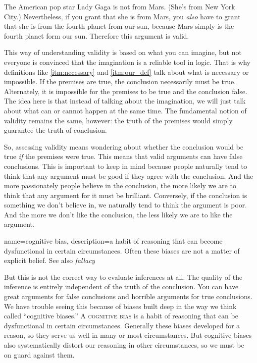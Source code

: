 The American pop star Lady Gaga is not from Mars. (She's from New York City.) Nevertheless, if you grant that she is from Mars, you \emph{also} have to grant that she is from the fourth planet from our sun, because Mars simply is the fourth planet form our sun. Therefore this argument is valid.

This way of understanding validity is based on what you can imagine, but not everyone is convinced that the imagination is a reliable tool in logic. That is why definitions like \ref{itm:necessary} and \ref{itm:our_def} talk about what is necessary or impossible. If the premises are true, the conclusion necessarily must be true. Alternately, it is impossible for the premises to be true and the conclusion false. The idea here is that instead of talking about the imagination, we will just talk about what can or cannot happen at the same time. The fundamental notion of validity remains the same, however: the truth of the premises would simply guarantee the truth of conclusion.

So, assessing validity means wondering about whether the conclusion would be true \textit{if} the premises were true. This means that valid arguments can have false conclusions. This is important to keep in mind because people naturally tend to think that any argument must be good if they agree with the conclusion. And the more passionately people believe in the conclusion, the more likely we are to think that any argument for it must be brilliant. Conversely, if the conclusion is something we don't believe in, we naturally tend to think the argument is poor. And the more we don't like the conclusion, the less likely we are to like the argument.





{
name=cognitive bias,
description={a habit of reasoning that can become dysfunctional in certain circumstances. Often these biases are not a matter of explicit belief. See also \emph{fallacy}}
}

But this is not the correct way to evaluate inferences at all. The quality of the inference is entirely independent of the truth of the conclusion. You can have great arguments for false conclusions and horrible arguments for true conclusions. We have trouble seeing this because of biases built deep in the way we think called ``cognitive biases.'' A  \textsc{\gls{cognitive bias}}\label{def:cognitive_bias} is a habit of reasoning that can be dysfunctional in certain circumstances. Generally these biases developed for a reason, so they serve us well in many or most circumstances. But cognitive biases also systematically distort our reasoning in other circumstances, so we must be on guard against them.

